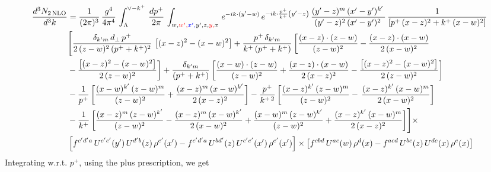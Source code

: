 \documentclass[9pt]{article}
\numberwithin{equation}{section}
\begin{document}
\begin{align}
 \frac{d^{3}N_{2\,\rm NLO}}{d^{3}k} & =  \frac{1}{(2\pi)^{3}}\,\frac{g^{4}}{4\pi^{4}}\,\int_{\Lambda}^{\vee-k^{+}}\, \frac{dp^{+}}{2\pi}\,\int_{w,{\color{red}w',}{\color{blue}x',}y',z,{\color{red}y,}x}\, e^{-ik\cdot (y'-w)}\,e^{-ik\cdot \frac{p^{+}}{k^{+}}\left(y'-z\right)}\, \frac{(y'-z)^{m}\,(x'-y')^{k'}\,}{(y'-z)^{2}\,(x'-y')^{2}\,}\, \frac{1}{\left[p^{+}\,(x-z)^{2}+k^{+}\,(x-w)^{2}\right]}\notag \\ & \Bigg[\frac{\delta_{k'm}\,d_{\perp}\,p^{+}}{2\,(z-w)^{2}\,(p^{+}+k^{+})^{2}}\, \left[(x-z)^{2}-(x-w)^{2}\right]+\frac{p^{+}\,\delta_{k'm}}{k^{+}\,(p^{+}+k^{+})}\,\bigg[\frac{(x-z)\cdot (z-w)}{(z-w)^{2}} -\frac{(x-z)\cdot (x-w)}{2\,(x-w)^{2}}\notag \\ & -\frac{\left[(x-z)^{2}-(x-w)^{2}\right]}{2\,(z-w)^{2}}\bigg] +\frac{\delta_{k'm}}{(p^{+}+k^{+})}\,\bigg[\frac{(x-w)\cdot (z-w)}{(z-w)^{2}}+\frac{(x-z)\cdot (x-w)}{2\,(x-z)^{2}} -\frac{\left[(x-z)^{2}-(x-w)^{2}\right]}{2\,(z-w)^{2}}\bigg]\notag \\ & -\frac{1}{p^{+}}\,\bigg[\frac{(x-w)^{k'}\,(z-w)^{m}}{(z-w)^{2}}+\frac{(x-z)^{m}\,(x-w)^{k'}}{2\,(x-z)^{2}}\bigg]-\frac{p^{+}}{k^{+\,2}}\,\bigg[\frac{(x-z)^{k'}\,(z-w)^{m}}{(z-w)^{2}} -\,\frac{(x-z)^{k'}\,(x-w)^{m}}{2\,(x-w)^{2}}\bigg]\notag \\ & -\frac{1}{k^{+}}\,\bigg[\frac{(x-z)^{m}\,(z-w)^{k'}}{(z-w)^{2}}-\frac{(x-z)^{m}\,(x-w)^{k'}}{2\,(x-w)^{2}}+\frac{(x-w)^{m}\,(z-w)^{k'}}{(z-w)^{2}} +\frac{(x-z)^{k'}\,(x-w)^{m}}{2\,(x-z)^{2}}\bigg]\Bigg]\times\,\notag \\ & \left[f^{c'd'a}\,U^{e'c'}(y')\,U^{d'b}(z)\,\rho^{e'}(x')-f^{c'd'a}\, 
    U^{bd'}(z)\,U^{c'e'}(x')\,\rho^{e'}(x')\right]\times \left[f^{cbd}\,U^{ac}(w)\,\rho^{d}(x) -f^{acd}\,U^{bc}(z)\,U^{de}(x)\,\rho^{e}(x)\right]
\end{align}
Integrating w.r.t. $p^{+}$, using the plus prescription, we get
\end{document}
